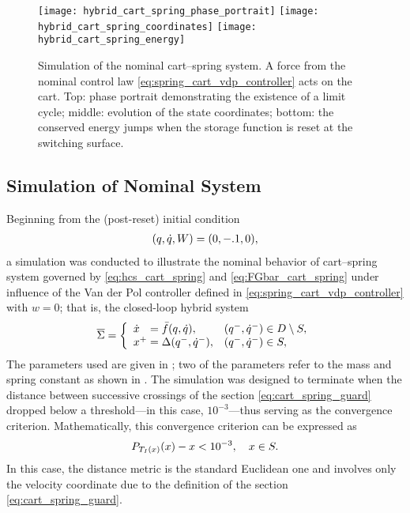 \begin{figure*}[htp!]
  \centering
  \texttt{[image: hybrid\_cart\_spring\_phase\_portrait]}
  \texttt{[image: hybrid\_cart\_spring\_coordinates]}
  \texttt{[image: hybrid\_cart\_spring\_energy]}
  \caption[Simulation of the nominal cart--spring system.]{Simulation of the
    nominal cart--spring system.
    A force from the nominal control law \eqref{eq:spring_cart_vdp_controller}
    acts on the cart.
    Top: phase portrait demonstrating the existence of a limit cycle;
    middle: evolution of the state coordinates;
    bottom: the conserved energy jumps when the storage function is reset at the
    switching surface.}
  \label{fig:cart_spring_simulation_nominal}
\end{figure*}


\subsection{Simulation of Nominal System}
Beginning from the (post-reset) initial condition
\begin{align*}
  (q, \dot{q}, W) = (0, -.1, 0),
\end{align*}
a simulation was conducted to illustrate the nominal behavior of cart--spring
system governed by \eqref{eq:hcs_cart_spring} and \eqref{eq:FGbar_cart_spring}
under influence of the Van der Pol controller defined in
\eqref{eq:spring_cart_vdp_controller} with $w = 0$;
% 
that is, the closed-loop hybrid system
\begin{align}
  \label{eq:hs_cart_spring_nominal}
  {\overline {\Sigma}} = \left\{
    \begin{array}{l l}
      {\dot {x}}\hphantom{^+} = {\bar {f}}(q, \dot{q}), & (q^{-}, \dot{q}^{-}) \in D \setminus S,\\
      x^{+} = \Delta(q^{-}, \dot{q}^{-}), & (q^{-}, \dot{q}^{-}) \in S,
    \end{array}\right.
\end{align}
% 
The parameters used are given in ; two of the
parameters refer to the mass and spring constant as shown in .
% 
The simulation was designed to terminate when the distance between successive
crossings of the \Poincare{} section \eqref{eq:cart_spring_guard} dropped below
a threshold---in this case, $10^{-3}$---thus serving as the convergence
criterion.
% 
Mathematically, this convergence criterion can be expressed as
\begin{align}
  \label{eq:cart_spring_convergence}
  P_{T_{I}(x)}(x) - x < 10^{-3}, \quad x \in S.
\end{align}
% 
In this case, the distance metric is the standard Euclidean one and involves
only the velocity coordinate due to the definition of the \Poincare{} section
\eqref{eq:cart_spring_guard}.


